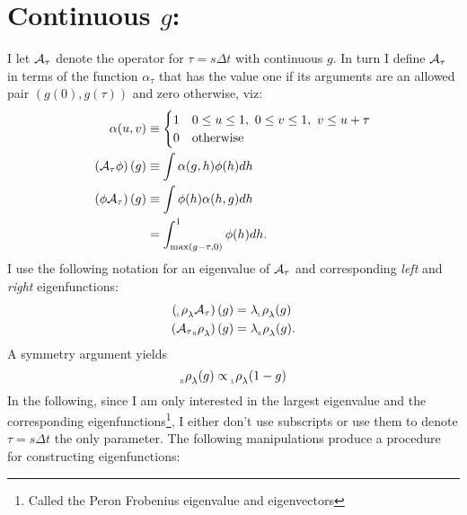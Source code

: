 \documentclass[12pt]{article} \usepackage{amsmath,amsfonts}
\newcommand{\Aop}{{\cal A}}
\newcommand{\Aindicate}{\alpha}
\newcommand{\slope}{s}
\newcommand{\function}{\phi}
\newcommand{\rightfunction}{{_{_{\scalebox{.4}{R}}} \rho}}
\newcommand{\leftfunction}{{_{_{\scalebox{.4}{L}}} \rho}}
\begin{document}
\section{Continuous $g$:}
\label{sec:continuous_g}

I let $\Aop_\tau$ denote the operator for $\tau = \slope \Delta t$ with
continuous $g$.  In turn I define $\Aop_\tau$ in terms of the function
$\Aindicate_\tau$ that has the value one if its arguments are an allowed
pair $\left( g(0), g(\tau) \right)$ and zero otherwise, viz:
\begin{subequations}
  \begin{align}
    \label{eq:indicate}
    \Aindicate(u,v) &\equiv
    \begin{cases}
      1 & 0 \leq u \leq 1,~ 0 \leq v \leq 1,~ v \leq u + \tau\\
      0 & \text{otherwise}
    \end{cases}\\
    \label{eq:operateright}
    \left( \Aop_\tau  \function \right)(g) &\equiv \int
            \Aindicate(g,h) \function(h) dh \\
    \label{eq:operate}
    \left( \function \Aop_\tau \right)(g) &\equiv \int
           \function(h) \Aindicate(h,g) dh \\
    &= \int_{\max(g-\tau,0)}^1 \function(h) dh.
  \end{align}
\end{subequations}
I use the following notation for an eigenvalue of $\Aop_\tau$ and
corresponding \emph{left} and \emph{right} eigenfunctions:
\begin{align*}
 \left( \leftfunction_\lambda \Aop_\tau \right)(g) &= \lambda
 \leftfunction_\lambda (g)\\
 \left(\Aop_\tau  \rightfunction_\lambda \right)(g) &= \lambda
 \rightfunction_\lambda (g).
\end{align*}
A symmetry argument yields
\begin{equation}
  \label{eq:symmetry}
  \rightfunction_\lambda(g) \propto \leftfunction_\lambda(1-g)
\end{equation}
In the following, since I am only interested in the largest
eigenvalue and the corresponding eigenfunctions\footnote{Called
  the Peron Frobenius eigenvalue and eigenvectors}, I either don't use
subscripts or use them to denote $\tau=s\Delta t$ the only
parameter.  The following manipulations produce a procedure for
constructing eigenfunctions:
\end{document}
